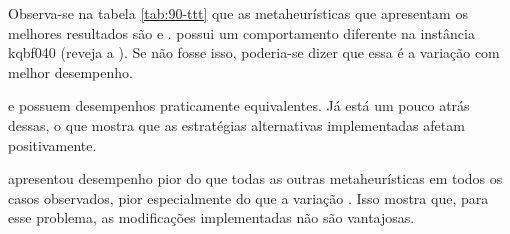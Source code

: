 Observa-se na tabela \ref{tab:90-ttt} que as metaheurísticas que apresentam os melhores resultados são \graspBest e \graspFirst. \graspBest possui um comportamento diferente na instância kqbf040 (reveja a ). Se não fosse isso, poderia-se dizer que essa é a variação com melhor desempenho.

\geneticVanilla e \tabuMod possuem desempenhos praticamente equivalentes. Já \tabuVanilla está um pouco atrás dessas, o que mostra que as estratégias alternativas implementadas afetam positivamente.

\geneticSteady apresentou desempenho pior do que todas as outras metaheurísticas em todos os casos observados, pior especialmente do que a variação \geneticVanilla. Isso mostra que, para esse problema, as modificações implementadas não são vantajosas.
